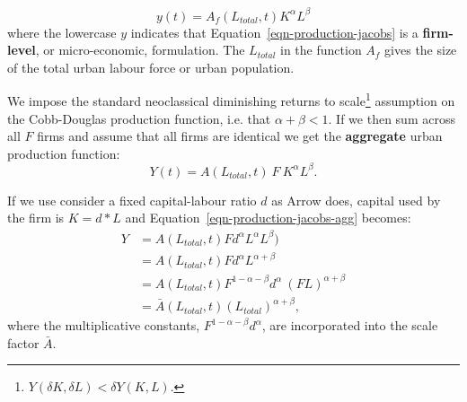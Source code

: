 \begin{equation}
y(t) = A_f(L_{total},t) K^\alpha L^\beta 
\label{eqn-production-jacobs}
\end{equation}
where the  lowercase $y$  indicates that Equation~\ref{eqn-production-jacobs} is a \textbf{firm-level}, or micro-economic, formulation. The $L_{total}$  in the function $A_f$ gives the size of the total urban labour force or urban population.

We impose the standard neoclassical diminishing returns to scale\footnote{$Y(\delta K,\delta L) < \delta Y(K,L)$.} assumption on the \gls{Cobb-Douglas} production function, i.e. that 
$\alpha +\beta <1$.  
 If we then sum across all $F$ firms and assume that all firms are identical we get the \textbf{aggregate} urban production function: 
\begin{equation}
Y(t) = A(L_{total}, t)\ F \ K^\alpha L^\beta. 
\label{eqn-production-jacobs-agg}
\end{equation}

If we use consider a fixed capital-labour ratio $d$ as Arrow does,  capital used by the firm is  $K=d*L$ and Equation~\ref{eqn-production-jacobs-agg} becomes: 
\begin{align}
Y &= A(L_{total}, t) F d^\alpha L^\alpha L^\beta) \nonumber\\
&=A(L_{total}, t)F d^\alpha L^{\alpha +\beta} \nonumber\\
&= A(L_{total}, t) F^{1-\alpha -\beta}d^\alpha \ (F L)^{\alpha +\beta} \nonumber \\
&=\bar A(L_{total}, t) (L_{total})^{\alpha +\beta},  
 \label{eqn-production-jacobs-city-2}
\end{align} 
where the  multiplicative constants,  $F^{1-\alpha -\beta}d^\alpha$, are incorporated into the scale factor $\bar A$. 

